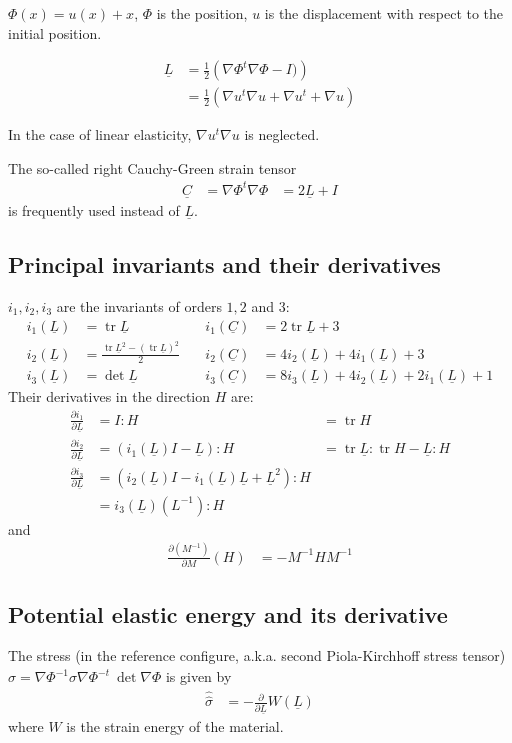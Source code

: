 \documentclass{article}
\newcommand{\TL}{\ensuremath{\underline{L}}}
\newcommand{\TC}{\ensuremath{\underline{C}}}
\newcommand{\DU}{\ensuremath{\nabla u}}
\newcommand{\DUt}{\ensuremath{\nabla u^t}}
\newcommand{\TS}{\ensuremath{\hat{\hat{\sigma}}}}
\newcommand{\Wlaw}{\ensuremath{W}}
\DeclareMathOperator{\Det}{det}
\DeclareMathOperator{\Trace}{tr}
\begin{document}
$\Phi(x) = u(x) + x$, $\Phi$ is the position, $u$ is the displacement with respect to the initial position.

\begin{align}
\TL &= \frac{1}{2}\left(\nabla\Phi^t\nabla\Phi - I)\right)\\
&= \frac{1}{2}\left(\DUt\DU + \DUt + \DU\right)
\end{align}

In the case of linear elasticity, $\DUt\DU$ is neglected.

The so-called right Cauchy-Green strain tensor
\begin{align}
\TC &= \nabla\Phi^t\nabla\Phi &= 2\TL + I
\end{align}
is frequently used instead of $\TL$.

\subsection{Principal invariants and their derivatives}
$i_1,i_2,i_3$ are the invariants of orders $1,2$ and $3$:
\begin{align}
  i_1(\TL) &= \Trace\TL &i_1(\TC) &= 2\Trace\TL + 3\\
  i_2(\TL) &= \frac{\Trace\TL^2 - (\Trace\TL)^2}{2}\quad& i_2(\TC)&=4i_2(\TL)+4i_1(\TL)+3\\
  i_3(\TL) &= \Det\TL &i_3(\TC) &= 8i_3(\TL) + 4i_2(\TL) + 2i_1(\TL) + 1
\end{align}
Their derivatives in the direction $H$ are:
\begin{align}
  \frac{\partial i_1}{\partial\TL} &= I:H &= \Trace H\\
  \frac{\partial i_2}{\partial\TL} &= (i_1(\TL)I - \TL):H &= \Trace \TL:\Trace H - \TL:H\\
  \frac{\partial i_3}{\partial\TL} &= (i_2(\TL)I - i_1(\TL)\TL + \TL^2):H \\
                  &= i_3(\TL)(L^{-1}):H
\end{align}
and
\begin{align}
\frac{\partial (M^{-1})}{\partial M}(H) &= -M^{-1}HM^{-1}
\end{align}

\subsection{Potential elastic energy and its derivative}

The stress (in the reference configure, a.k.a. second Piola-Kirchhoff stress tensor) $\TS = \nabla\Phi^{-1}\sigma\nabla\Phi^{-t}~\Det \nabla\Phi$ is given by
\begin{align}
  \TS &= -\frac{\partial}{\partial\TL} \Wlaw(\TL)
\end{align}
where $\Wlaw$ is the strain energy of the material.
\end{document}
